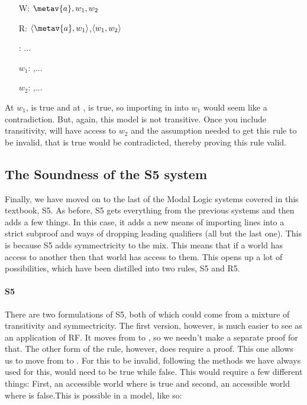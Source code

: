 \begin{center}
\end{center}
\begin{itemize}
\item[W:] $\metav{a},w_1,w_2$
\item[R:]$\openntuple \metav{a},w_1\closentuple$,$\langle w_1,w_2\rangle$  
\item[\metav{a}:] ... 
\item[$w_1$:] ,...
\item[$w_2$:] \enot{},...
\end{itemize}
 
 At $w_1$, \enot\ebox{} is true and at , \ebox{} is true, so importing in \ebox{} into $w_1$ would seem like a contradiction. But, again, this model is not transitive. Once you include transitivity,  will have access to $w_2$ and the assumption needed to get this rule to be invalid, that \ebox{} is true would be contradicted, thereby proving this rule valid. 
 

\subsection{The Soundness of the S5 system}

Finally, we have moved on to the last of the Modal Logic systems covered in this textbook, S5. As before, S5 gets everything from the previous systems and then adds a few things. In this case, it adds a new means of importing lines into a strict subproof and ways of dropping leading qualifiers (all but the last one). This is because S5 adds symmectricity to the mix. This means that if a world has access to another then that world has access to them. This opens up a lot of possibilities, which have been distilled into two rules, S5 and R5.

\paragraph{S5}
There are two formulations of S5, both of which could come from a mixture of transitivity and symmectricity. The first version, however, is much easier to see as an application of RF. It moves from \ebox\ediamond{} to \ediamond{}, so we needn't make a separate proof for that. The other form of the rule, however, does require a proof. This one allows us to move from \ediamond\ebox{} to \ebox{}. For this to be invalid, following the methods we have always used for this, \ediamond\ebox{} would need to be true while \ebox{} false. This would require a few different things: First, an accessible world where \ebox{} is true and second, an accessible world where  is false.This is possible in a model, like so:

